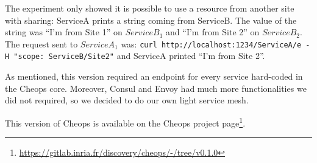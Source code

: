 The experiment only showed it is possible to use a resource from
another site with sharing: ServiceA prints a string coming from
ServiceB.
%
The value of the string was ``I'm from Site 1'' on $ServiceB_1$ and
``I'm from Site 2'' on $ServiceB_2$.
%
The request sent to $ServiceA_1$ was:
\verb|curl http://localhost:1234/ServiceA/e -H "scope: ServiceB/Site2"|
and ServiceA printed ``I'm from Site 2''.

As mentioned, this version required an endpoint for every service
hard-coded in the Cheops core.
%
Moreover, Consul and Envoy had much more functionalities we did not
required, so we decided to do our own light service mesh.


This version of Cheops is available on the Cheops project
page\footnote{\url{https://gitlab.inria.fr/discovery/cheops/-/tree/v0.1.0}}.
